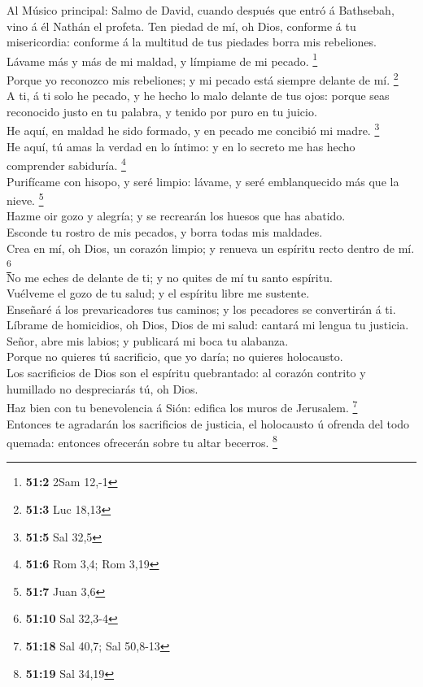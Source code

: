  Al Músico principal: Salmo de David, cuando después que
entró á Bathsebah, vino á él Nathán el profeta. Ten piedad de mí, oh
Dios, conforme á tu misericordia: conforme á la multitud de tus piedades
borra mis rebeliones.\\
 Lávame más y más de mi maldad, y límpiame de mi pecado.
\footnote{\textbf{51:2} 2Sam 12,-1}\\
 Porque yo reconozco mis rebeliones; y mi pecado está
siempre delante de mí. \footnote{\textbf{51:3} Luc 18,13}\\
 A ti, á ti solo he pecado, y he hecho lo malo delante de
tus ojos: porque seas reconocido justo en tu palabra, y tenido por puro
en tu juicio.\\
 He aquí, en maldad he sido formado, y en pecado me
concibió mi madre. \footnote{\textbf{51:5} Sal 32,5}\\
 He aquí, tú amas la verdad en lo íntimo: y en lo secreto
me has hecho comprender sabiduría. \footnote{\textbf{51:6} Rom 3,4; Rom
  3,19}\\
 Purifícame con hisopo, y seré limpio: lávame, y seré
emblanquecido más que la nieve. \footnote{\textbf{51:7} Juan 3,6}\\
 Hazme oir gozo y alegría; y se recrearán los huesos que
has abatido.\\
 Esconde tu rostro de mis pecados, y borra todas mis
maldades.\\
 Crea en mí, oh Dios, un corazón limpio; y renueva un
espíritu recto dentro de mí. \footnote{\textbf{51:10} Sal 32,3-4}\\
 No me eches de delante de ti; y no quites de mí tu santo
espíritu.\\
 Vuélveme el gozo de tu salud; y el espíritu libre me
sustente.\\
 Enseñaré á los prevaricadores tus caminos; y los
pecadores se convertirán á ti.\\
 Líbrame de homicidios, oh Dios, Dios de mi salud:
cantará mi lengua tu justicia.\\
 Señor, abre mis labios; y publicará mi boca tu
alabanza.\\
 Porque no quieres tú sacrificio, que yo daría; no
quieres holocausto.\\
 Los sacrificios de Dios son el espíritu quebrantado: al
corazón contrito y humillado no despreciarás tú, oh Dios.\\
 Haz bien con tu benevolencia á Sión: edifica los muros
de Jerusalem. \footnote{\textbf{51:18} Sal 40,7; Sal 50,8-13}\\
 Entonces te agradarán los sacrificios de justicia, el
holocausto ú ofrenda del todo quemada: entonces ofrecerán sobre tu altar
becerros. \footnote{\textbf{51:19} Sal 34,19}

